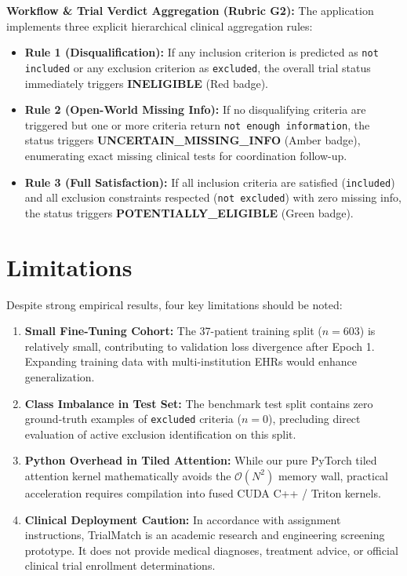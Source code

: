 \documentclass[conference]{IEEEtran}
\begin{document}
\textbf{Workflow \& Trial Verdict Aggregation (Rubric G2):} The application implements three explicit hierarchical clinical aggregation rules:
\begin{itemize}
    \item \textbf{Rule 1 (Disqualification):} If any inclusion criterion is predicted as \texttt{not included} or any exclusion criterion as \texttt{excluded}, the overall trial status immediately triggers \textbf{INELIGIBLE} (Red badge).
    \item \textbf{Rule 2 (Open-World Missing Info):} If no disqualifying criteria are triggered but one or more criteria return \texttt{not enough information}, the status triggers \textbf{UNCERTAIN\_MISSING\_INFO} (Amber badge), enumerating exact missing clinical tests for coordination follow-up.
    \item \textbf{Rule 3 (Full Satisfaction):} If all inclusion criteria are satisfied (\texttt{included}) and all exclusion constraints respected (\texttt{not excluded}) with zero missing info, the status triggers \textbf{POTENTIALLY\_ELIGIBLE} (Green badge).
\end{itemize}

\section{Limitations}
\label{sec:limitations}

Despite strong empirical results, four key limitations should be noted:
\begin{enumerate}
    \item \textbf{Small Fine-Tuning Cohort:} The 37-patient training split ($n=603$) is relatively small, contributing to validation loss divergence after Epoch 1. Expanding training data with multi-institution EHRs would enhance generalization.
    \item \textbf{Class Imbalance in Test Set:} The benchmark test split contains zero ground-truth examples of \texttt{excluded} criteria ($n=0$), precluding direct evaluation of active exclusion identification on this split.
    \item \textbf{Python Overhead in Tiled Attention:} While our pure PyTorch tiled attention kernel mathematically avoids the $\mathcal{O}(N^2)$ memory wall, practical acceleration requires compilation into fused CUDA C++ / Triton kernels.
    \item \textbf{Clinical Deployment Caution:} In accordance with assignment instructions, TrialMatch is an academic research and engineering screening prototype. It does not provide medical diagnoses, treatment advice, or official clinical trial enrollment determinations.
\end{enumerate}
\end{document}
